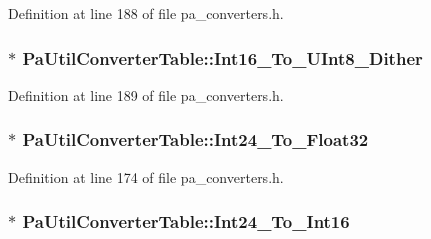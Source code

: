 Definition at line 188 of file pa\+\_\+converters.\+h.

\subsubsection[{\texorpdfstring{Int16\+\_\+\+To\+\_\+\+U\+Int8\+\_\+\+Dither}{Int16_To_UInt8_Dither}}]{$\ast$ Pa\+Util\+Converter\+Table\+::\+Int16\+\_\+\+To\+\_\+\+U\+Int8\+\_\+\+Dither}\hypertarget{struct_pa_util_converter_table_a74b1e7234626dab3016bcc9cef1bb466}{}\label{struct_pa_util_converter_table_a74b1e7234626dab3016bcc9cef1bb466}


Definition at line 189 of file pa\+\_\+converters.\+h.

\subsubsection[{\texorpdfstring{Int24\+\_\+\+To\+\_\+\+Float32}{Int24_To_Float32}}]{$\ast$ Pa\+Util\+Converter\+Table\+::\+Int24\+\_\+\+To\+\_\+\+Float32}\hypertarget{struct_pa_util_converter_table_a5f94481df4abfd3eb09321dd3ed348b1}{}\label{struct_pa_util_converter_table_a5f94481df4abfd3eb09321dd3ed348b1}


Definition at line 174 of file pa\+\_\+converters.\+h.

\subsubsection[{\texorpdfstring{Int24\+\_\+\+To\+\_\+\+Int16}{Int24_To_Int16}}]{$\ast$ Pa\+Util\+Converter\+Table\+::\+Int24\+\_\+\+To\+\_\+\+Int16}\hypertarget{struct_pa_util_converter_table_a2a9d1a2f5457aceb7e6a687b2918b9a6}{}\label{struct_pa_util_converter_table_a2a9d1a2f5457aceb7e6a687b2918b9a6}


